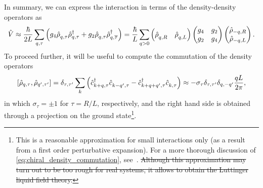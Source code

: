 \documentclass{svmono}
\def\pdag{{\vphantom\dag}}
\newcommand{\commutator}[1]{\left[ #1 \right]}
\newcommand{\brlr}[1]{\left( #1 \right)}
\providecommand{\DIFdeltex}[1]{{\protect\color{red}\sout{#1}}}                      %
\providecommand{\DIFaddbegin}{} %
\providecommand{\DIFaddend}{} %
\providecommand{\DIFdelbegin}{} %
\providecommand{\DIFdelend}{} %
\providecommand{\DIFdel}[1]{\texorpdfstring{\DIFdeltex{#1}}{}} %
\newcommand{\DIFscaledelfig}{0.5}
\newlength{\DIFdelgraphicswidth} %
\newlength{\DIFdelgraphicsheight} %
\newcommand{\DIFaddincludegraphics}[2][]{{\color{blue}\fbox{\DIFOincludegraphics[#1]{#2}}}} %
\newcommand{\DIFdelincludegraphics}[2][]{%
\sbox{\DIFdelgraphicsbox}{\DIFOincludegraphics[#1]{#2}}%
\settoboxwidth{\DIFdelgraphicswidth}{\DIFdelgraphicsbox} %
\settoboxtotalheight{\DIFdelgraphicsheight}{\DIFdelgraphicsbox} %
\scalebox{\DIFscaledelfig}{%
\parbox[b]{\DIFdelgraphicswidth}{\usebox{\DIFdelgraphicsbox}\\[-\baselineskip] \rule{\DIFdelgraphicswidth}{0em}}\llap{\resizebox{\DIFdelgraphicswidth}{\DIFdelgraphicsheight}{%
\setlength{\unitlength}{\DIFdelgraphicswidth}%
\begin{picture}(1,1)%
\thicklines\linethickness{2pt} %
{\color[rgb]{1,0,0}\put(0,0){\framebox(1,1){}}}%
{\color[rgb]{1,0,0}\put(0,0){\line( 1,1){1}}}%
{\color[rgb]{1,0,0}\put(0,1){\line(1,-1){1}}}%
\end{picture}%
}\hspace*{3pt}}} %
} %
\DeclareRobustCommand{\DIFaddbegin}{\DIFOaddbegin \let\includegraphics\DIFaddincludegraphics} %
\DeclareRobustCommand{\DIFaddend}{\DIFOaddend \let\includegraphics\DIFOincludegraphics} %
\DeclareRobustCommand{\DIFdelbegin}{\DIFOdelbegin \let\includegraphics\DIFdelincludegraphics} %
\DeclareRobustCommand{\DIFdelend}{\DIFOaddend \let\includegraphics\DIFOincludegraphics} %
\begin{document}
In summary, we can express the interaction in terms of the density-density operators as
\begin{align}
    \hat V \approx \frac{\hbar}{2L}\sum_{q,\tau}\brlr{g_4\hat\rho^\pdag_{q,\tau}\hat\rho^\dag_{q,\tau} + g_2\hat\rho^\pdag_{q,\tau}\hat\rho^\dag_{q,\overline\tau}}
    =
    \frac{\hbar}{L}\sum_{q>0}
    \begin{pmatrix}
        \hat\rho^\pdag_{q,R} & \hat\rho^\pdag_{q,L}
    \end{pmatrix}
    \begin{pmatrix}
        g_4 & g_2 \\
        g_2 & g_4
    \end{pmatrix}
    \begin{pmatrix}
        \hat\rho_{-q,R} \\ \hat\rho_{-q,L}
    \end{pmatrix}
    .
    \label{eq:interaction_densities}
\end{align}
To proceed further, it will be useful to compute the commutation of the density operators
\DIFdelbegin %
\DIFdelend \DIFaddbegin \begin{align}
    \commutator{\hat\rho_{q,\tau},\hat\rho_{q',\tau'}}
    =
    \delta_{\tau,\tau'}\sum_k\brlr{\hat c^\dag_{k+q,\tau}\hat c^\pdag_{k-q',\tau}-\hat c^\dag_{k+q+q',\tau}\hat c^\pdag_{k,\tau}}
    \approx
    -\sigma_\tau\delta_{\tau,\tau'}\delta_{q,-q'}\frac{qL}{2\pi},
    \label{eq:chiral_density_commutation}
\end{align}\DIFaddend 
in which $\sigma_\tau=\pm1$ for $\tau=R/L$, respectively, and the right hand side is obtained through a projection on the ground state\footnote{This is a reasonable approximation for small interactions only (as a result from a first order perturbative expansion).
For a more thorough discussion of \cref{eq:chiral_density_commutation}, see~\cite{Giamarchi2003}.
\DIFdelbegin \DIFdel{Although this approximation may turn out to be too rough for real systems, it allows to obtain the Luttinger liquid field theory.}\DIFdelend }.
\end{document}
